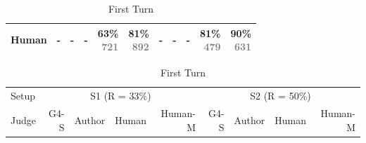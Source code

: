 \begin{table}[h]
\begin{subtable}[t]{\textwidth}
{\begin{tabular}[t]{lrrrrrrrrrr}
 \midrule
Human & - & - & - & \shortstack{63\% \\ \textcolor{gray}{ 721 }} & \shortstack{81\% \\ \textcolor{gray}{ 892 }} & - & - & - & \shortstack{81\% \\ \textcolor{gray}{ 479 }} & \shortstack{90\% \\ \textcolor{gray}{ 631 }}\\
 \midrule
\end{tabular}
}
\caption{First Turn}
\label{table:mt_bench_more_first_turn}
\end{subtable}

\begin{subtable}[t]{\textwidth}
\centering
\begin{tabular}[t]{lrrrrrrrr}
\toprule
Setup & \multicolumn{4}{c}{S1 (R = 33\%)} & \multicolumn{4}{c}{S2 (R = 50\%)} \\
\cmidrule(lr){2-5}\cmidrule(lr){6-9}

Judge & G4-S & Author & Human & Human-M & G4-S & Author & Human & Human-M \\
\midrule
 

\end{tabular}
\end{subtable}
\end{table}
